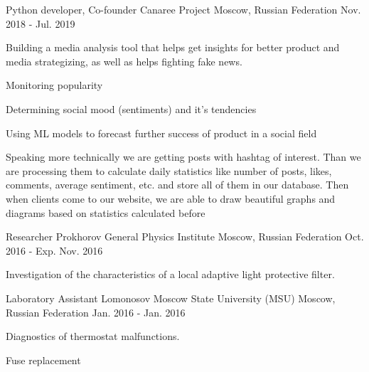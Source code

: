 \begin{cventries}
  \cventry
    {Python developer, Co-founder} %
    {Canaree Project} %
    {Moscow, Russian Federation} %
    {Nov. 2018 - Jul. 2019} %
    {
      \begin{cvitems} %
        \item {Building a media analysis tool that helps get insights for better product and media strategizing, as well as helps fighting fake news.}
        \item {Monitoring popularity}
        \item {Determining social mood (sentiments) and it's tendencies}
        \item {Using ML models to forecast further success of product in a social field}
        \item {Speaking more technically we are getting posts with hashtag of interest.
        Than we are processing them to calculate daily statistics like number of posts,
        likes, comments, average sentiment, etc. and store all of them in our database.
        Then when clients come to our website, we are able to draw beautiful graphs and
        diagrams based on statistics calculated before
        }
      \end{cvitems}
    }

  \cventry
    {Researcher} %
    {Prokhorov General Physics Institute} %
    {Moscow, Russian Federation} %
    {Oct. 2016 - Exp. Nov. 2016} %
    {
      \begin{cvitems} %
        \item {Investigation of the characteristics of a local adaptive light protective filter.}
      \end{cvitems}
    }

  \cventry
    {Laboratory Assistant} %
    {Lomonosov Moscow State University (MSU)} %
    {Moscow, Russian Federation} %
    {Jan. 2016 - Jan. 2016} %
    {
      \begin{cvitems} %
        \item {Diagnostics of thermostat malfunctions.}
        \item {Fuse replacement}
      \end{cvitems}
    }

\end{cventries}
